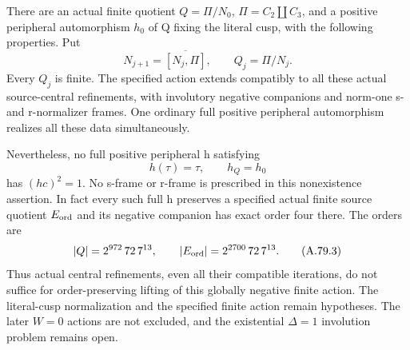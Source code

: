 There are an actual finite quotient \(Q=\Pi/N_0\),
\(\Pi=C_2\amalg C_3\), and a positive peripheral automorphism
\(h_0\) of Q fixing the literal cusp, with the following properties.
Put
\[
 N_{j+1}=\overline{[N_j,\Pi]},\qquad Q_j=\Pi/N_j.
 \tag{A.79.1}
\]
Every \(Q_j\) is finite. The specified action extends compatibly
to all these actual source-central refinements, with involutory
negative companions and norm-one s- and r-normalizer frames.
One ordinary full positive peripheral automorphism realizes all
these data simultaneously.

Nevertheless, no full positive peripheral h satisfying
\[
                  h(\tau)=\tau,\qquad h_Q=h_0
 \tag{A.79.2}
\]
has \((hc)^2=1\). No s-frame or r-frame is prescribed in this
nonexistence assertion. In fact every such full h preserves a
specified actual finite source quotient \(E_{\rm ord}\) and its
negative companion has exact order four there. The orders are
\[
 |Q|=2^{972}\,72\,7^{13},\qquad
 |E_{\rm ord}|=2^{2700}\,72\,7^{13}.
 \tag{A.79.3}
\]
Thus actual central refinements, even all their compatible
iterations, do not suffice for order-preserving lifting of this
globally negative finite action. The literal-cusp normalization
and the specified finite action remain hypotheses. The later
\(W=0\) actions are not excluded, and the existential
\(\Delta=1\) involution problem remains open.

